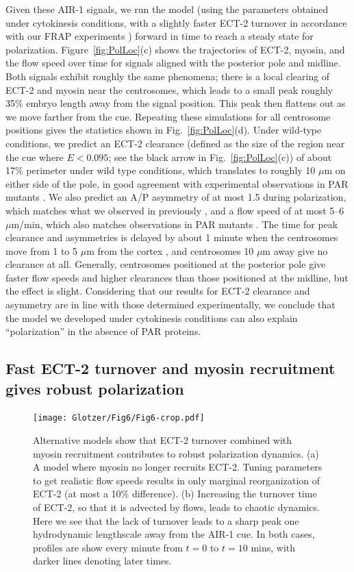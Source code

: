 \documentclass[11pt]{article}
\begin{document}
Given these AIR-1 signals, we run the model (using the parameters obtained under cytokinesis conditions, with a slightly faster ECT-2 turnover in accordance with our FRAP experiments \citep[Fig.~3D]{longhini2022aurora}) forward in time to reach a steady state for polarization. Figure\ \ref{fig:PolLoc}(c) shows the trajectories of ECT-2, myosin, and the flow speed over time for signals aligned with the posterior pole and midline. Both signals exhibit roughly the same phenomena; there is a local clearing of ECT-2 and myosin near the centrosomes, which leads to a small peak roughly 35\% embryo length away from the signal position. This peak then flattens out as we move farther from the cue. Repeating these simulations for all centrosome positions gives the statistics shown in Fig.\ \ref{fig:PolLoc}(d). Under wild-type conditions, we predict an ECT-2 clearance (defined as the size of the region near the cue where $E < 0.095$; see the black arrow in Fig.\ \ref{fig:PolLoc}(c)) of about 17\% perimeter under wild type conditions, which translates to roughly 10 $\mu$m on either side of the pole, in good agreement with experimental observations in PAR mutants \citep[Fig.~2E]{gross2019guiding}. We also predict an A/P asymmetry of at most 1.5 during polarization, which matches what we observed in previously \citep[Fig.~1]{longhini2022aurora}, and a flow speed of at most 5--6 $\mu$m/min, which also matches observations in PAR mutants \citep[Fig.~2G]{gross2019guiding}. The time for peak clearance and asymmetries is delayed by about 1 minute when the centrosomes move from 1 to 5 $\mu$m from the cortex \citep[Fig.~3F]{bienkowska2012centrosomes}, and centrosomes 10 $\mu$m away give no clearance at all. Generally, centrosomes positioned at the posterior pole give faster flow speeds and higher clearances than those positioned at the midline, but the effect is slight. Considering that our results for ECT-2 clearance and asymmetry are in line with those determined experimentally, we conclude that the model we developed under cytokinesis conditions can also explain ``polarization'' in the absence of PAR proteins.


\subsection{Fast ECT-2 turnover and myosin recruitment gives robust polarization \label{sec:EctTurn}}

\begin{figure}
\centering
\texttt{[image: Glotzer/Fig6/Fig6-crop.pdf]}
\caption{\label{fig:EctTurn}Alternative models show that ECT-2 turnover combined with myosin recruitment contributes to robust polarization dynamics. (a) A model where myosin no longer recruits ECT-2. Tuning parameters to get realistic flow speeds results in only marginal reorganization of ECT-2 (at most a 10\% difference). (b) Increasing the turnover time of ECT-2, so that it is advected by flows, leads to chaotic dynamics. Here we see that the lack of turnover leads to a sharp peak one hydrodynamic lengthscale away from the AIR-1 cue. In both cases, profiles are show every minute from $t=0$ to $t=10$ mins, with darker lines denoting later times.}
\end{figure}
\end{document}
